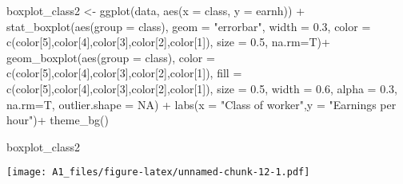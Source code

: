\documentclass[
]{article}
\newenvironment{Shaded}{\begin{snugshade}}{\end{snugshade}}
\newcommand{\AttributeTok}[1]{\textcolor[rgb]{0.77,0.63,0.00}{#1}}
\newcommand{\CommentTok}[1]{\textcolor[rgb]{0.56,0.35,0.01}{\textit{#1}}}
\newcommand{\ConstantTok}[1]{\textcolor[rgb]{0.00,0.00,0.00}{#1}}
\newcommand{\DecValTok}[1]{\textcolor[rgb]{0.00,0.00,0.81}{#1}}
\newcommand{\FloatTok}[1]{\textcolor[rgb]{0.00,0.00,0.81}{#1}}
\newcommand{\FunctionTok}[1]{\textcolor[rgb]{0.00,0.00,0.00}{#1}}
\newcommand{\NormalTok}[1]{#1}
\newcommand{\OtherTok}[1]{\textcolor[rgb]{0.56,0.35,0.01}{#1}}
\newcommand{\SpecialCharTok}[1]{\textcolor[rgb]{0.00,0.00,0.00}{#1}}
\newcommand{\StringTok}[1]{\textcolor[rgb]{0.31,0.60,0.02}{#1}}
\begin{document}
\begin{Shaded}
\begin{Highlighting}[]
\NormalTok{boxplot\_class2 }\OtherTok{\textless{}{-}} \FunctionTok{ggplot}\NormalTok{(data, }\FunctionTok{aes}\NormalTok{(}\AttributeTok{x =}\NormalTok{ class, }\AttributeTok{y =}\NormalTok{ earnh)) }\SpecialCharTok{+}
  \FunctionTok{stat\_boxplot}\NormalTok{(}\FunctionTok{aes}\NormalTok{(}\AttributeTok{group =}\NormalTok{ class), }\AttributeTok{geom =} \StringTok{"errorbar"}\NormalTok{, }\AttributeTok{width =} \FloatTok{0.3}\NormalTok{,}
               \AttributeTok{color =} \FunctionTok{c}\NormalTok{(color[}\DecValTok{5}\NormalTok{],color[}\DecValTok{4}\NormalTok{],color[}\DecValTok{3}\NormalTok{],color[}\DecValTok{2}\NormalTok{],color[}\DecValTok{1}\NormalTok{]), }\AttributeTok{size =} \FloatTok{0.5}\NormalTok{, }\AttributeTok{na.rm=}\NormalTok{T)}\SpecialCharTok{+}
  \FunctionTok{geom\_boxplot}\NormalTok{(}\FunctionTok{aes}\NormalTok{(}\AttributeTok{group =}\NormalTok{ class),}
               \AttributeTok{color =} \FunctionTok{c}\NormalTok{(color[}\DecValTok{5}\NormalTok{],color[}\DecValTok{4}\NormalTok{],color[}\DecValTok{3}\NormalTok{],color[}\DecValTok{2}\NormalTok{],color[}\DecValTok{1}\NormalTok{]), }\AttributeTok{fill =} \FunctionTok{c}\NormalTok{(color[}\DecValTok{5}\NormalTok{],color[}\DecValTok{4}\NormalTok{],color[}\DecValTok{3}\NormalTok{],color[}\DecValTok{2}\NormalTok{],color[}\DecValTok{1}\NormalTok{]),}
               \AttributeTok{size =} \FloatTok{0.5}\NormalTok{, }\AttributeTok{width =} \FloatTok{0.6}\NormalTok{, }\AttributeTok{alpha =} \FloatTok{0.3}\NormalTok{, }\AttributeTok{na.rm=}\NormalTok{T, }\AttributeTok{outlier.shape =} \ConstantTok{NA}\NormalTok{) }\SpecialCharTok{+}
  \FunctionTok{labs}\NormalTok{(}\AttributeTok{x =} \StringTok{"Class of worker"}\NormalTok{,}\AttributeTok{y =} \StringTok{"Earnings per hour"}\NormalTok{)}\SpecialCharTok{+}
  \FunctionTok{theme\_bg}\NormalTok{()}

\NormalTok{boxplot\_class2}
\end{Highlighting}
\end{Shaded}

\texttt{[image: A1\_files/figure-latex/unnamed-chunk-12-1.pdf]}

\begin{Shaded}
\end{Shaded}
\end{document}
